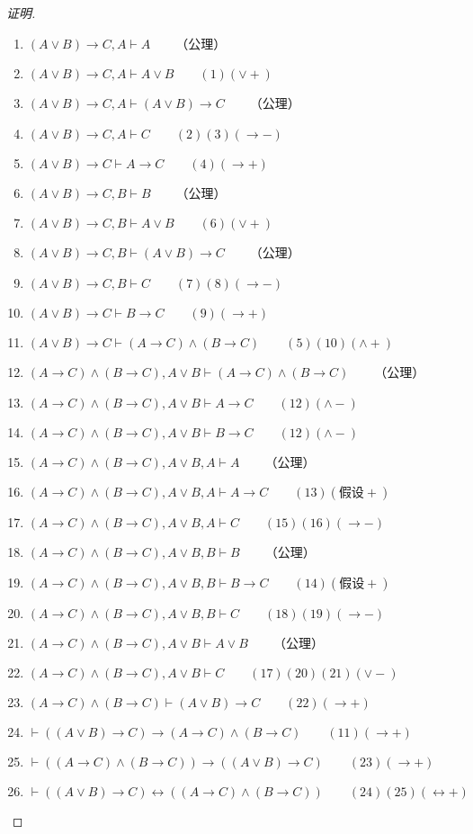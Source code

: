 \documentclass{article}
\begin{document}
\begin{CJK*}{UTF8}{gbsn}
\begin{proof}[证明]
      \begin{enumerate}
        \item $(A\lor B)\to C, A\vdash A\qquad$（公理）
        \item $(A\lor B)\to C, A\vdash A\lor B\qquad(1)(\lor +)$
        \item $(A\lor B)\to C, A\vdash (A\lor B)\to C\qquad$（公理）
        \item $(A\lor B)\to C, A\vdash C\qquad(2)(3)(\to -)$
        \item $(A\lor B)\to C\vdash A\to C\qquad(4)(\to +)$
        \item $(A\lor B)\to C, B\vdash B\qquad$（公理）
        \item $(A\lor B)\to C, B\vdash A\lor B\qquad(6)(\lor +)$
        \item $(A\lor B)\to C, B\vdash (A\lor B)\to C\qquad$（公理）
        \item $(A\lor B)\to C, B\vdash C\qquad(7)(8)(\to -)$
        \item $(A\lor B)\to C\vdash B\to C\qquad(9)(\to +)$
        \item $(A\lor B)\to C\vdash (A\to C)\land (B\to C)\qquad(5)(10)(\land +)$
        \item $(A\to C)\land (B\to C),A\lor B\vdash (A\to C)\land (B\to C)\qquad$（公理）
        \item $(A\to C)\land (B\to C),A\lor B\vdash A\to C\qquad(12)(\land -)$
        \item $(A\to C)\land (B\to C),A\lor B\vdash B\to C\qquad(12)(\land -)$
        \item $(A\to C)\land (B\to C),A\lor B, A\vdash A\qquad$（公理）
        \item $(A\to C)\land (B\to C),A\lor B,A\vdash A\to C\qquad(13)(\text{假设} +)$
        \item $(A\to C)\land (B\to C),A\lor B,A\vdash C\qquad(15)(16)(\to -)$
        \item $(A\to C)\land (B\to C),A\lor B, B\vdash B\qquad$（公理）
        \item $(A\to C)\land (B\to C),A\lor B,B\vdash B\to C\qquad(14)(\text{假设} +)$
        \item $(A\to C)\land (B\to C),A\lor B,B\vdash C\qquad(18)(19)(\to -)$
        \item $(A\to C)\land (B\to C),A\lor B\vdash A\lor B\qquad$（公理）
        \item $(A\to C)\land (B\to C),A\lor B\vdash C\qquad(17)(20)(21)(\lor -)$
        \item $(A\to C)\land (B\to C)\vdash (A\lor B)\to C\qquad(22)(\to +)$
        \item $\vdash((A\lor B)\to C)\to (A\to C)\land (B\to C)\qquad(11)(\to +)$
        \item $\vdash ((A\to C)\land (B\to C))\to ((A\lor B)\to C)\qquad(23)(\to +)$
        \item $\vdash ((A\lor B)\to C)\leftrightarrow((A\to C)\land (B\to C))\qquad (24)(25)(\leftrightarrow +)$
      \end{enumerate}


\end{proof}
\end{CJK*}
\end{document}
